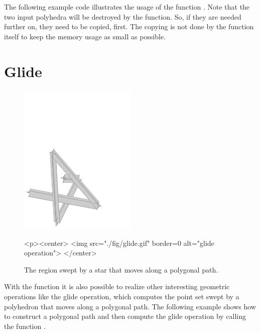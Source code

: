 The following example code illustrates the usage of the function
. Note that the two input polyhedra will be
destroyed by the function. So, if they are needed further on, they
need to be copied, first. The copying is not done by the function
itself to keep the memory usage as small as possible.


\section{Glide}

\begin{figure}
  \begin{ccTexOnly}
    \begin{center}
      \includegraphics[width=0.5\textwidth]{Minkowski_sum_3/fig/glide}
    \end{center}
  \end{ccTexOnly}
  \begin{ccHtmlOnly}
    <p><center>
    <img src="./fig/glide.gif" border=0 alt="glide operation">
    </center>
  \end{ccHtmlOnly}
  \caption{The region swept by a star that moves along a polygonal path.}
\end{figure}

With the function  it is also possible to realize
other interesting geometric operations like the glide operation, which
computes the point set swept by a polyhedron that moves along a
polygonal path. The following example shows how to construct a
polygonal path and then compute the glide operation by calling the
function .

